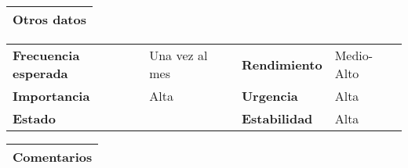 \documentclass[11pt,a4paper]{article}
\begin{document}
\begin{table}[H]
	\begin{tabularx}{\textwidth}{X}
		\textbf{Otros datos}\\ \hline
	\end{tabularx}
	\begin{tabularx}{\textwidth}{lXlX}
		\textbf{Frecuencia esperada} & Una vez al mes & \textbf{Rendimiento} & Medio-Alto\\
		\textbf{Importancia} & Alta & \textbf{Urgencia} & Alta\\
                \textbf{Estado} & & \textbf{Estabilidad} & Alta\\
	\end{tabularx}
	\begin{tabularx}{\textwidth}{X}
		\textbf{Comentarios}\\ \hline	
	\end{tabularx}
\end{table}
\end{document}
